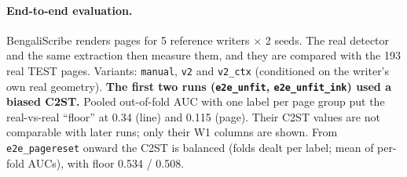 \documentclass[10.5pt,a4paper]{article}
\begin{document}
\paragraph{End-to-end evaluation.} BengaliScribe renders pages for 5 reference writers $\times$ 2 seeds. The real detector
and the same extraction then measure them, and they are compared with the 193 real TEST pages. Variants: \texttt{manual},
\texttt{v2} and \texttt{v2\_ctx} (conditioned on the writer's own real geometry). \textbf{The first two runs
(\texttt{e2e\_unfit}, \texttt{e2e\_unfit\_ink}) used a biased C2ST.} Pooled out-of-fold AUC with one label per page group put
the real-vs-real ``floor'' at 0.34 (line) and 0.115 (page). Their C2ST values are not comparable with later runs; only their
W1 columns are shown. From \texttt{e2e\_pagereset} onward the C2ST is balanced (folds dealt per label; mean of per-fold
AUCs), with floor 0.534 / 0.508.
\end{document}

